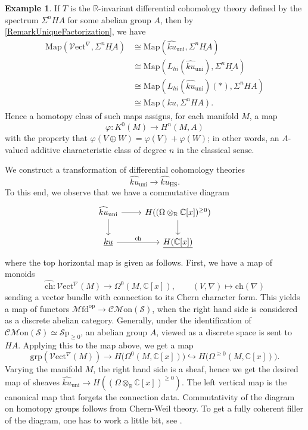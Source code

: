 \documentclass[a4paper]{book}
\newcommand{\lC}{\mathcal{C}}
\newcommand{\bC}{\mathbb{C}}
\newcommand{\lM}{\mathcal{M}}
\newcommand{\bR}{\mathbb{R}}
\newcommand{\lS}{\mathcal{S}}
\newcommand{\lV}{\mathcal{V}}
\newcommand{\Sp}{\lS\mathrm{p}} %
\newcommand{\Mon}{\lM\mathrm{on}} %
\newcommand{\CMon}{\lC\Mon} %
\newcommand{\ch}{\mathrm{ch}}
\newcommand{\Mfd}{\lM\mathrm{fd}} %
\newcommand{\Vect}{\lV\mathrm{ect}} %
\theoremstyle{definition}
\newtheorem{example}[equation]{Example}
\theoremstyle{remark}
\numberwithin{equation}{section}
\begin{document}
\begin{example}
If $T$ is the $\bR$-invariant differential cohomology theory defined by the spectrum $\Sigma^n HA$ for some abelian group $A$, then by \cref{RemarkUniqueFactorization}, we have
\begin{align*}
\mathrm{Map}(\Vect^\nabla,  \Sigma^n \underline{HA})
&\cong 
\mathrm{Map}(\widehat{ku}{}_{\mathrm{uni}},  \Sigma^n \underline{HA})
\\
&\cong 
\mathrm{Map}(L_{hi}(\widehat{ku}{}_{\mathrm{uni}}),  \Sigma^n \underline{HA})
\\
&\cong 
\mathrm{Map}(L_{hi}(\widehat{ku}{}_{\mathrm{uni}})(*),  \Sigma^n HA)
\\
&\cong 
\mathrm{Map}(ku,  \Sigma^n HA).
\end{align*}
Hence a homotopy class of such maps assigns, for each manifold $M$, a map
\[
\varphi : K^0(M) \longrightarrow H^n(M, A)
\]
with the property that $\varphi(V \oplus W) = \varphi(V) + \varphi(W)$; in other words, an $A$-valued additive characteristic class of degree $n$ in the classical sense.
\end{example}





We construct a transformation of differential cohomology theories
\[
\widehat{ku}{}_{\mathrm{uni}} \longrightarrow \widehat{ku}_{\mathrm{HS}}.
\]
To this end, we observe that we have a commutative diagram
\[
\begin{tikzcd}
	\widehat{ku}_{\mathrm{uni}} \ar[r] \ar[d] & H((\Omega \otimes_\bR \bC[x])^{\geq 0})
	\ar[d]
	\\
	\underline{ku} \ar[r, "\ch"] 
	& \underline{H(\bC[x])}
\end{tikzcd}
\]
where the top horizontal map is given as follows. First, we have a map of monoids
\[
\widehat{\ch} : \Vect^\nabla(M) \longrightarrow \Omega^0(M, \bC[x]), \qquad (V, \nabla) \longmapsto \ch(\nabla)
\]
sending a vector bundle with connection to its Chern character form. This yields a map of functors $\Mfd^{\mathrm{op}} \to \CMon(\lS)$, when the right hand side is considered as a discrete abelian category. Generally, under the identification of $\CMon(\lS) \simeq \Sp_{\geq 0}$, an abelian group $A$, viewed as a discrete space is sent to $HA$. Applying this to the map above, we get a map
\[
\mathrm{grp}(\Vect^\nabla(M)) \longrightarrow H\bigl(\Omega^{0}(M, \bC[x])\bigr) \hookrightarrow H\bigl(\Omega^{\geq 0}(M, \bC[x])\bigr).
\]
Varying the manifold $M$, the right hand side is a sheaf, hence we get the desired map of sheaves $\widehat{ku}_{\mathrm{uni}} \to H((\Omega \otimes_\bR \bC[x])^{\geq 0})$. The left vertical map is the canonical map that forgets the connection data. Commutativity of the diagram on homotopy groups follows from Chern-Weil theory. To get a fully coherent filler of the diagram, one has to work a little bit, see \cite[\S6.1]{bunkenikolausvoelkl2016diffcoh}.
\end{document}
